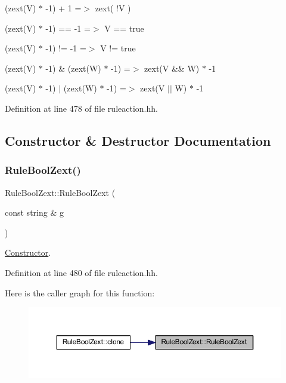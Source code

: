 \begin{DoxyItemize}
\item {\ttfamily (zext(\+V) $\ast$ -\/1) + 1 =$>$ zext( !V )}
\item {\ttfamily (zext(\+V) $\ast$ -\/1) == -\/1 =$>$ V == true}
\item {\ttfamily (zext(\+V) $\ast$ -\/1) != -\/1 =$>$ V != true}
\item {\ttfamily (zext(\+V) $\ast$ -\/1) \& (zext(\+W) $\ast$ -\/1) =$>$ zext(\+V \&\& W) $\ast$ -\/1}
\item {\ttfamily (zext(\+V) $\ast$ -\/1) $\vert$ (zext(\+W) $\ast$ -\/1) =$>$ zext(V $\vert$$\vert$ W) $\ast$ -\/1} 
\end{DoxyItemize}

Definition at line 478 of file ruleaction.\+hh.



\subsection{Constructor \& Destructor Documentation}
\mbox{\label{class_rule_bool_zext_abd48faf70b2f00bccc115c43a0a65930}} 
\subsubsection{\texorpdfstring{RuleBoolZext()}{RuleBoolZext()}}
{\footnotesize\ttfamily Rule\+Bool\+Zext\+::\+Rule\+Bool\+Zext (\begin{DoxyParamCaption}\item[{const string \&}]{g }\end{DoxyParamCaption})\hspace{0.3cm}{\ttfamily [inline]}}



\mbox{\hyperlink{class_constructor}{Constructor}}. 



Definition at line 480 of file ruleaction.\+hh.

Here is the caller graph for this function\+:
\nopagebreak
\begin{figure}[H]
\begin{center}
\leavevmode
\includegraphics[width=350pt]{class_rule_bool_zext_abd48faf70b2f00bccc115c43a0a65930_icgraph}
\end{center}
\end{figure}


